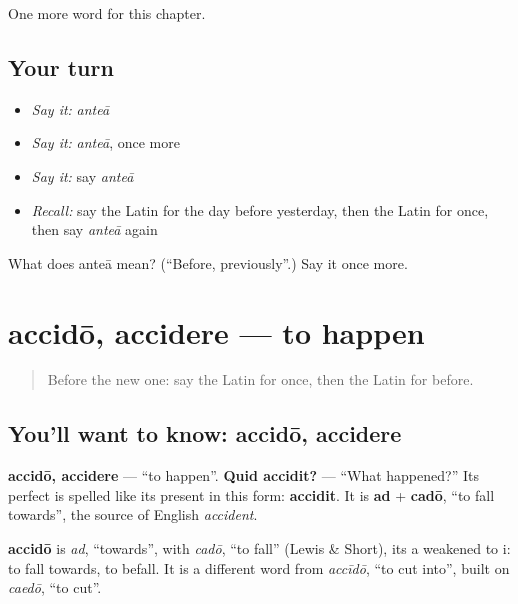 \begin{grammarlens}[title={What you've built}]
One more word for this chapter.
\end{grammarlens}

\subsection*{Your turn}
\begin{itemize}
\raggedright
  \item \emph{Say it:} \emph{anteā}
  \item \emph{Say it:} \emph{anteā}, once more
  \item \emph{Say it:} say \emph{anteā}
  \item \emph{Recall:} say the Latin for the day before yesterday, then the Latin for once, then say \emph{anteā} again
\end{itemize}

\begin{tcolorbox}[breakable,colback=teal!4,colframe=teal!35!black,title={Before you move on}]
What does anteā mean? (\textquotedblleft{}Before, previously\textquotedblright{}.) Say it once more.
\end{tcolorbox}
\section[accidō, accidere]{accidō, accidere — to happen}

\label{lesson:LA-C162-accido}



\begin{quote}
Before the new one: say the Latin for once, then the Latin for before.
\end{quote}

\subsection*{You'll want to know: accidō, accidere}
\textbf{accidō, accidere} — \textquotedblleft{}to happen\textquotedblright{}. \textbf{Quid accidit?} — \textquotedblleft{}What happened?\textquotedblright{} Its perfect is spelled like its present in this form: \textbf{accidit}. It is \textbf{ad} + \textbf{cadō}, \textquotedblleft{}to fall towards\textquotedblright{}, the source of English \emph{accident}.

\begin{cousinweb}
\textbf{accidō} is \emph{ad}, \textquotedblleft{}towards\textquotedblright{}, with \emph{cadō}, \textquotedblleft{}to fall\textquotedblright{} (Lewis \& Short), its a weakened to i: to fall towards, to befall. It is a different word from \emph{accīdō}, \textquotedblleft{}to cut into\textquotedblright{}, built on \emph{caedō}, \textquotedblleft{}to cut\textquotedblright{}.
\end{cousinweb}

